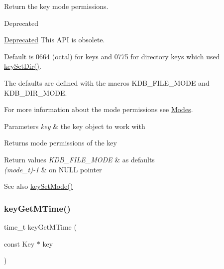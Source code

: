Return the key mode permissions. 

\begin{DoxyRefDesc}{Deprecated}
\item[\hyperlink{deprecated__deprecated000018}{Deprecated}]This A\+PI is obsolete.\end{DoxyRefDesc}


Default is 0664 (octal) for keys and 0775 for directory keys which used \hyperlink{group__meta_gaae575bd86a628a15ee45baa860522e75}{key\+Set\+Dir()}.

The defaults are defined with the macros K\+D\+B\+\_\+\+F\+I\+L\+E\+\_\+\+M\+O\+DE and K\+D\+B\+\_\+\+D\+I\+R\+\_\+\+M\+O\+DE.

For more information about the mode permissions see \hyperlink{group__meta_mode}{Modes}.


\begin{DoxyParams}{Parameters}
{\em key} & the key object to work with \\
\hline
\end{DoxyParams}
\begin{DoxyReturn}{Returns}
mode permissions of the key 
\end{DoxyReturn}

\begin{DoxyRetVals}{Return values}
{\em K\+D\+B\+\_\+\+F\+I\+L\+E\+\_\+\+M\+O\+DE} & as defaults \\
\hline
{\em (mode\+\_\+t)-\/1} & on N\+U\+LL pointer \\
\hline
\end{DoxyRetVals}
\begin{DoxySeeAlso}{See also}
\hyperlink{group__meta_ga8803037e35b9da1ce492323a88ff6bc3}{key\+Set\+Mode()} 
\end{DoxySeeAlso}
\mbox{\label{group__meta_ga57689eb5691679071463b777ae786ae9}} 
\subsubsection{\texorpdfstring{key\+Get\+M\+Time()}{keyGetMTime()}}
{\footnotesize\ttfamily time\+\_\+t key\+Get\+M\+Time (\begin{DoxyParamCaption}\item[{const Key $\ast$}]{key }\end{DoxyParamCaption})}



